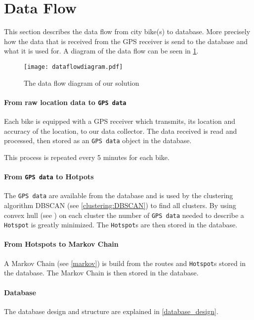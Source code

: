 \section{Data Flow}\label{data_flow}
This section describes the data flow from city bike(s) to database. More precisely how the data that is received from the GPS receiver is send to the database and what it is used for.
A diagram of the data flow can be seen in \cref{fig:dataFlowDiagram}.

\begin{figure}[H]
\texttt{[image: dataflowdiagram.pdf]}
\caption{The data flow diagram of our solution}
\label{fig:dataFlowDiagram}
\end{figure}

\paragraph{From raw location data to \texttt{GPS data}}
Each bike is equipped with a GPS receiver which transmits, its location and accuracy of the location, to our data collector.
The data received is read and processed, then stored as an \texttt{GPS data} object in the database.

This process is repeated every 5 minutes for each bike.

\paragraph{From \texttt{GPS data} to Hotpots}
The \texttt{GPS data} are available from the database and is used by the clustering algorithm DBSCAN (see \cref{clustering:DBSCAN}) to find all clusters.
By using convex hull (see \cite[page 1031]{aadbook}) on each cluster the number of \texttt{GPS data} needed to describe a \texttt{Hotspot} is greatly minimized.
The \texttt{Hotspot}s are then stored in the database.

\paragraph{From Hotspots to Markov Chain}
A Markov Chain (see \cref{markov}) is build from the routes and \texttt{Hotspot}s stored in the database.
The Markov Chain is then stored in the database.

\paragraph{Database}
The database design and structure are explained in \cref{database_design}.
